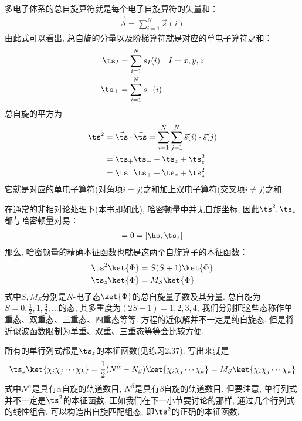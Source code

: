 多电子体系的总自旋算符就是每个电子自旋算符的矢量和：
\begin{align}
\vec{\mathscr{S}} = \sum_{i=1}^{N}\vec{s}(i)
\end{align}
由此式可以看出, 
总自旋的分量以及阶梯算符就是对应的单电子算符之和：
\begin{subequations}
	\begin{align}
	\ts_I   & = \sum_{i=1}^{N}s_I(i)\quad I=x,y,z\\
	\ts_\pm & = \sum_{i=1}^{N}s_\pm(i) 
	\end{align}
\end{subequations}
总自旋的平方为
\begin{align}
\ts^2 & = \vec{\ts}\cdot\vec{\ts} = \sum_{i=1}^{N}\sum_{j=1}^{N} \vec{s}(i)\cdot\vec{s}(j) \notag \\
      & = \ts_+\ts_- - \ts_z + \ts^2_z\notag\\
      & = \ts_-\ts_+ + \ts_z + \ts^2_z
\end{align}
它就是对应的单电子算符(对角项$i=j$)之和加上双电子算符(交叉项$i\neq j$)之和.


在通常的非相对论处理下(本书即如此), 
哈密顿量中并无自旋坐标, 
因此$\ts^2,\ts_z$都与哈密顿量对易：
\begin{align}
[\hs,\ts^2] = 0 = [\hs,\ts_z]
\end{align} 
那么, 
哈密顿量的精确本征函数也就是这两个自旋算子的本征函数：
\begin{subequations}
	\begin{align}
	\ts^2\ket{\Phi} & = S(S+1)\ket{\Phi}\\
	\ts_z\ket{\Phi} & = M_S\ket{\Phi}
	\end{align}
\end{subequations}
式中$S,M_S$分别是$N$-电子态$\ket{\Phi}$的总自旋量子数及其分量. 
总自旋为$S=0,\frac{1}{2},1,\frac{3}{2},\ldots$的态, 
其多重度为$(2S+1)=1,2,3,4$, 
我们分别把这些态称作单重态、双重态、三重态、四重态等等. 
\sch 方程的近似解并不一定是纯自旋态. 
但是将近似波函数限制为单重、双重、三重态等等会比较方便.


所有的单行列式都是$\ts_z$的本征函数(见练习2.37). 
写出来就是
\begin{align}
\label{2.254}
\ts_z\ket{\chi_i\chi_j\cdots\chi_k} = \frac{1}{2}(N^\alpha - N_\beta)\ket{\chi_i\chi_j\cdots\chi_k} = M_S\ket{\chi_i\chi_j\cdots\chi_k}
\end{align}
式中$N^\alpha$是具有$\alpha$自旋的轨道数目, 
$N^\beta$是具有$\beta$自旋的轨道数目. 
但要注意, 
单行列式并不一定是$\ts^2$的本征函数. 
正如我们在下一小节要讨论的那样, 
通过几个行列式的线性组合, 
可以构造出自旋匹配组态, 
即$\ts^2$的正确的本征函数.

